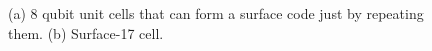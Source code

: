\begin{figure}[h!]
\centerline{
}
\caption{(a) 8 qubit unit cells that can form a surface code just by repeating them. (b) Surface-17 cell.}
\label{Surface17}
\end{figure}




